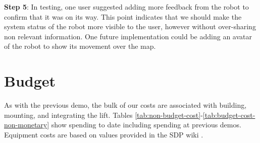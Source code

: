 \documentclass{article}
\begin{document}
{\bf Step 5}: In testing, one user suggested adding more feedback from the robot to confirm that it was on its way. This point indicates that we should make the system status of the robot more visible to the user, however without over-sharing non relevant information. One future implementation could be adding an avatar of the robot to show its movement over the map.

\section{Budget}
As with the previous demo, the bulk of our costs are associated with building, mounting, and integrating the lift. Tables \ref{tab:non-budget-cost}-\ref{tab:budget-cost-non-monetary} show spending to date including spending at previous demos. Equipment costs are based on values provided in the SDP wiki \cite{sdpcosts}.

\begin{table}[h]
\begin{center}
\caption{Non-budgeted monetary costs at demo \demoNumber. Note that we have chosen to stop using the EV3 and instead use the Arduino kit.}
\label{tab:non-budget-cost}
\end{center}
\end{table}
\end{document}
